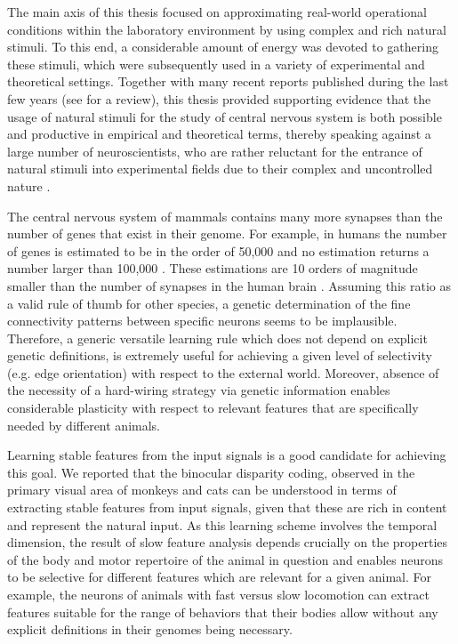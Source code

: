 The main axis of this thesis focused on approximating real-world
operational conditions within the laboratory environment by using complex
and rich natural stimuli. To this end, a considerable amount of energy was
devoted to gathering these stimuli, which were subsequently used in a
variety of experimental and theoretical settings. Together with many recent
reports published during the last few years (see \cite{felsen2005a} for a
review), this thesis provided supporting evidence that the usage of natural
stimuli for the study of central nervous system is both possible and
productive in empirical and theoretical terms, thereby speaking against a
large number of neuroscientists, who are rather reluctant for the entrance
of natural stimuli into experimental fields due to their complex and
uncontrolled nature \citep{rust2005a}. 


The central nervous system of mammals contains many more synapses than the
number of genes that exist in their genome. For example, in humans the
number of genes is estimated to be in the order of 50,000 and no estimation
returns a number larger than 100,000 \citep{venter2001a}. These estimations
are 10 orders of magnitude smaller than the number of synapses in the human
brain \citep{Herculano-Houzel2009a}. Assuming this ratio as a valid rule of
thumb for other species, a genetic determination of the fine connectivity
patterns between specific neurons seems to be implausible. Therefore, a
generic versatile learning rule which does not depend on explicit genetic
definitions, is extremely useful for achieving a given level of selectivity
(e.g. edge orientation) with respect to the external world. Moreover,
absence of the necessity of a hard-wiring strategy via genetic information
enables considerable plasticity with respect to relevant features that are
specifically needed by different animals. 


Learning stable features from the input signals is a good candidate for
achieving this goal. We reported that the binocular disparity coding,
observed in the primary visual area of monkeys and cats can be understood
in terms of extracting stable features from input signals, given that these
are rich in content and represent the natural input. As this learning
scheme involves the temporal dimension, the result of slow feature analysis
depends crucially on the properties of the body and motor repertoire of the
animal in question and enables neurons to be selective for different
features which are relevant for a given animal. For example, the neurons of
animals with fast versus slow locomotion can extract features suitable for
the range of behaviors that their bodies allow without any explicit
definitions in their genomes being necessary. 


